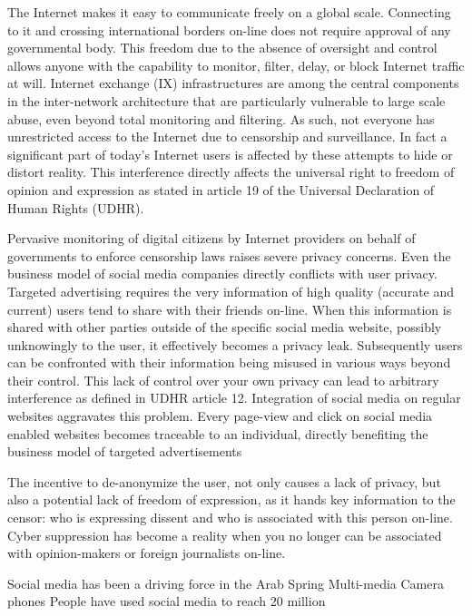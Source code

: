 The Internet makes it easy to communicate freely on a global scale.
Connecting to it and crossing international borders on-line does not require approval of any governmental body.
This freedom due to the absence of oversight and control allows anyone with the capability to monitor, filter, delay, or block Internet traffic at will.
Internet exchange (IX) infrastructures are among the central components in the inter-network architecture that are particularly vulnerable to large scale abuse, even beyond total monitoring and filtering.
As such, not everyone has unrestricted access to the Internet due to censorship and surveillance.
In fact a significant part of today's Internet users is affected by these attempts to hide or distort reality. %
This interference directly affects the universal right to freedom of opinion and expression as stated in article 19 of the Universal Declaration of Human Rights (UDHR).

Pervasive monitoring of digital citizens by Internet providers on behalf of governments to enforce censorship laws raises severe privacy concerns.
Even the business model of social media companies directly conflicts with user privacy.
Targeted advertising requires the very information of high quality (accurate and current) users tend to share with their friends on-line.
When this information is shared with other parties outside of the specific social media website, possibly unknowingly to the user, it effectively becomes a privacy leak.
Subsequently users can be confronted with their information being misused in various ways beyond their control.
This lack of control over your own privacy can lead to arbitrary interference as defined in UDHR article 12. %
Integration of social media on regular websites aggravates this problem.
Every page-view and click on social media enabled websites becomes traceable to an individual, directly benefiting the business model of targeted advertisements

The incentive to de-anonymize the user, not only causes a lack of privacy, but also a potential lack of freedom of expression, as it hands key information to the censor: who is expressing dissent and who is associated with this person on-line.
Cyber suppression has become a reality when you no longer can be associated with opinion-makers or foreign journalists on-line.

Social media has been a driving force in the Arab Spring 
Multi-media 
Camera phones
People have used social media to reach 20 million 


